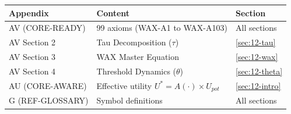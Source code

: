 \begin{tcolorbox}[
    colback=yellow!10!white,
    colframe=orange!75!black,
    title={\textbf{Appendix References for This Chapter}},
    fonttitle=\bfseries
]
\begin{tabular}{lll}
\textbf{Appendix} & \textbf{Content} & \textbf{Section} \\
\midrule
AV (CORE-READY) & 99 axioms (WAX-A1 to WAX-A103) & All sections \\
AV Section 2 & Tau Decomposition ($\tau$) & \ref{sec:12-tau} \\
AV Section 3 & WAX Master Equation & \ref{sec:12-wax} \\
AV Section 4 & Threshold Dynamics ($\theta$) & \ref{sec:12-theta} \\
AU (CORE-AWARE) & Effective utility $U^* = A(\cdot) \times U_{pot}$ & \ref{sec:12-intro} \\
G (REF-GLOSSARY) & Symbol definitions & All sections
\end{tabular}
\end{tcolorbox}


